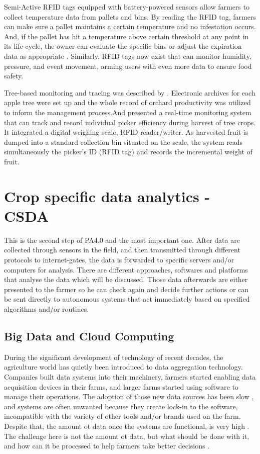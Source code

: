\documentclass[review]{elsarticle}
\begin{document}
    Semi-Active RFID tags equipped with battery-powered sensors allow farmers to collect temperature data from pallets and bins. By reading the RFID tag, farmers can make sure a pallet maintains a certain temperature and no infestation occurs. And, if the pallet has hit a temperature above certain threshold at any point in its life-cycle, the owner can evaluate the specific bins or adjust the expiration data as appropriate \cite{Piramuthu_2013}. Similarly, RFID tags now exist that can monitor humidity, pressure, and event movement, arming users with even more data to ensure food safety.

    Tree-based monitoring and tracing was described by \cite{Wu_2013, Ampatzidis_2009, Luvisi_2011}. Electronic archives for each apple tree were set up and the whole record of orchard productivity was utilized to inform the management process.And \cite{Ampatzidis20123726} presented a real-time monitoring system that can track and record individual picker efficiency during harvest of tree crops. It integrated a digital weighing scale, RFID reader/writer. As harvested fruit is dumped into a standard collection bin situated on the scale, the system reads simultaneously the picker's ID (RFID tag) and records the incremental weight of fruit.

\section{Crop specific data analytics - CSDA}
    This is the second step of PA4.0 and the most important one. After data are collected through sensors in the field, and then transmitted through different protocols to internet-gates, the data is forwarded to specific servers and/or computers for analysis. There are different approaches, softwares and platforms that analyse the data which will be discussed. Those data afterwards are either presented to the farmer so he can check again and decide further actions or can be sent directly to autonomous systems that act immediately based on specified algorithms and/or routines.

    \subsection{Big Data and Cloud Computing}
    During the significant development of technology of recent decades, the agriculture world has quietly been introduced to data aggregation technology. Companies built data systems into their machinery, farmers started enabling data acquisition devices in their farms, and larger farms started using software to manage their operations. The adoption of those new data sources has been slow \cite{Pierpaoli_2013}, and systems are often unwanted because they create lock-in to the software, incompatible with the variety of other tools and/or brands used on the farm. Despite that, the amount ot data once the systems are functional, is very high \cite{Fountas_2006}. The challenge here is not the amount ot data, but what should be done with it, and how can it be processed to help farmers take better decisions \cite{Wolfert_2017, McBratney_2005}.
\end{document}
